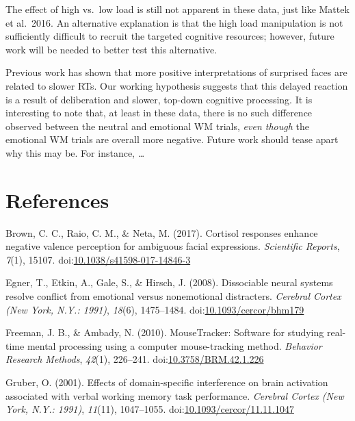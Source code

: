 \documentclass[man]{apa6}
\begin{document}
The effect of high vs.~low load is still not apparent in these data, just like Mattek et al.~2016. An alternative explanation is that the high load manipulation is not sufficiently difficult to recruit the targeted cognitive resources; however, future work will be needed to better test this alternative.

Previous work has shown that more positive interpretations of surprised faces are related to slower RTs. Our working hypothesis suggests that this delayed reaction is a result of deliberation and slower, top-down cognitive processing. It is interesting to note that, at least in these data, there is no such difference observed between the neutral and emotional WM trials, \emph{even though} the emotional WM trials are overall more negative. Future work should tease apart why this may be. For instance, \ldots{}

\newpage

\hypertarget{references}{%
\section{References}\label{references}}

\begingroup
\setlength{\parindent}{-0.5in}
\setlength{\leftskip}{0.5in}

\hypertarget{refs}{}
\leavevmode\hypertarget{ref-brown_cortisol_2017}{}%
Brown, C. C., Raio, C. M., \& Neta, M. (2017). Cortisol responses enhance negative valence perception for ambiguous facial expressions. \emph{Scientific Reports}, \emph{7}(1), 15107. doi:\href{https://doi.org/10.1038/s41598-017-14846-3}{10.1038/s41598-017-14846-3}

\leavevmode\hypertarget{ref-egner_dissociable_2008}{}%
Egner, T., Etkin, A., Gale, S., \& Hirsch, J. (2008). Dissociable neural systems resolve conflict from emotional versus nonemotional distracters. \emph{Cerebral Cortex (New York, N.Y.: 1991)}, \emph{18}(6), 1475--1484. doi:\href{https://doi.org/10.1093/cercor/bhm179}{10.1093/cercor/bhm179}

\leavevmode\hypertarget{ref-freeman_mousetracker:_2010}{}%
Freeman, J. B., \& Ambady, N. (2010). MouseTracker: Software for studying real-time mental processing using a computer mouse-tracking method. \emph{Behavior Research Methods}, \emph{42}(1), 226--241. doi:\href{https://doi.org/10.3758/BRM.42.1.226}{10.3758/BRM.42.1.226}

\leavevmode\hypertarget{ref-gruber_effects_2001}{}%
Gruber, O. (2001). Effects of domain-specific interference on brain activation associated with verbal working memory task performance. \emph{Cerebral Cortex (New York, N.Y.: 1991)}, \emph{11}(11), 1047--1055. doi:\href{https://doi.org/10.1093/cercor/11.11.1047}{10.1093/cercor/11.11.1047}
\end{document}
